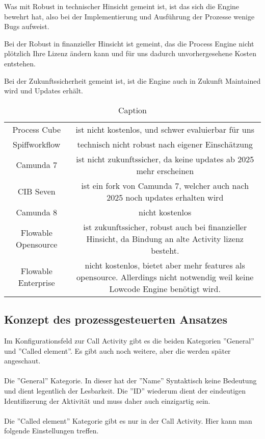 Was mit Robust in technischer Hinsicht gemeint ist, ist das sich die Engine bewehrt hat, also bei der Implementierung und Ausführung der Prozesse wenige Bugs aufweist.

Bei der Robust in finanzieller Hinsicht ist gemeint, das die Process Engine nicht plötzlich Ihre Lizenz ändern kann und für uns dadurch unvorhergesehene Kosten entstehen.

Bei der Zukunftssicherheit gemeint ist, ist die Engine auch in Zukunft Maintained wird und Updates erhält.

\begin{table}[]
    \centering
    \begin{tabular}{c|c}
        Process Cube & ist nicht kostenlos, und schwer evaluierbar für uns \\
        Spiffworkflow & technisch nicht robust nach eigener Einschätzung \\
        Camunda 7 & ist nicht zukunftssicher, da keine updates ab 2025 mehr erscheinen \\
        CIB Seven & ist ein fork von Camunda 7, welcher auch nach 2025 noch updates erhalten wird \\
        Camunda 8 & nicht kostenlos \\      
        Flowable Opensource & ist zukunftssicher, robust auch bei finanzieller Hinsicht, da Bindung an alte Activity lizenz besteht. \\
        Flowable Enterprise & nicht kostenlos, bietet aber mehr features als opensource. Allerdings nicht notwendig weil keine Lowcode Engine benötigt wird.        
    \end{tabular}
    \caption{Caption}
    \label{tab:my_label}
\end{table}

\subsection{Konzept des prozessgesteuerten Ansatzes}



Im Konfigurationsfeld zur Call Activity gibt es die beiden Kategorien ''General'' und ''Called element''. Es gibt auch noch weitere, aber die werden später angeschaut. 
\\\\
Die ''General'' Kategorie. In dieser hat der ''Name'' Syntaktisch keine Bedeutung und dient legentlich der Lesbarkeit. Die ''ID'' wiederum dient der eindeutigen Identifizerung der Aktivität und muss daher auch einzigartig sein.
\\\\
Die ''Called element'' Kategorie gibt es nur in der Call Activity. Hier kann man folgende Einstellungen treffen.

